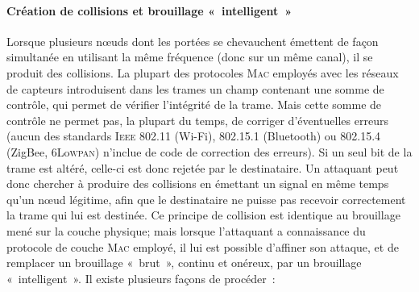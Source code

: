         \paragraph{Création de collisions et brouillage « intelligent »}
Lorsque plusieurs nœuds dont les portées se chevauchent émettent de façon simultanée en utilisant la même fréquence (donc sur un même canal), il se produit des collisions.
La plupart des protocoles \textsc{Mac} employés avec les réseaux de capteurs introduisent dans les trames un champ contenant une somme de contrôle, qui permet de vérifier l'intégrité de la trame.
Mais cette somme de contrôle ne permet pas, la plupart du temps, de corriger d'éventuelles erreurs (aucun des standards \textsc{Ieee} 802.11 (Wi-Fi), 802.15.1 (Bluetooth) ou 802.15.4 (ZigBee, 6Lo\textsc{wpan}) n'inclue de code de correction des erreurs).
Si un seul bit de la trame est altéré, celle-ci est donc rejetée par le destinataire.
Un attaquant peut donc chercher à produire des collisions en émettant un signal en même temps qu'un nœud légitime, afin que le destinataire ne puisse pas recevoir correctement la trame qui lui est destinée.
Ce principe de collision est identique au brouillage mené sur la couche physique; mais lorsque l'attaquant a connaissance du protocole de couche \textsc{Mac} employé, il lui est possible d'affiner son attaque, et de remplacer un brouillage « brut », continu et onéreux, par un brouillage « intelligent ».
Il existe plusieurs façons de procéder~\cite{PI11}:
